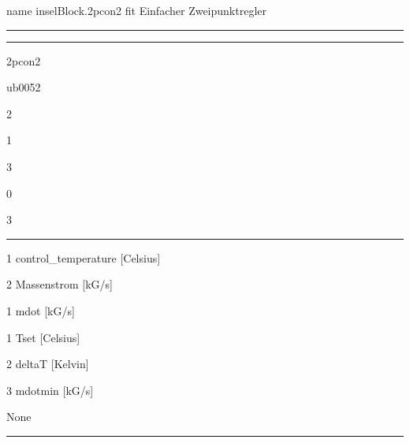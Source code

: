 \label{2pcon2}\hypertarget{2pcon2}{}
\pdfdest name {inselBlock.2pcon2} fit
Einfacher Zweipunktregler

\bigskip

\hrule

\begin{center}

\end{center}

\medskip

\hrule

\begin{layoutlist}
\item[{\bf \mblue{Name}}]        2pcon2
\item[{\bf \mblue{Function}}]    ub0052
\item[{\bf \mblue{Inputs}}]      2
\item[{\bf \mblue{Outputs}}]     1
\item[{\bf \mblue{Parameters}}]  3
\item[{\bf \mblue{Strings}}]     0
\item[{\bf \mblue{Group}}]       3
\end{layoutlist}

\medskip

\hrule

\bigskip

%
\begin{detaillist}
\item[1] control_temperature [Celsius]
\item[2] Massenstrom [kG/s]
\end{detaillist}

%
\begin{detaillist}
\item[1] mdot [kG/s]
\end{detaillist}

%
\begin{detaillist}
\item[1] Tset [Celsius]
\item[2] deltaT [Kelvin]
\item[3] mdotmin [kG/s]
\end{detaillist}

%
\begin{detaillist}
\item[]  None
\end{detaillist}

\bigskip

\hrule
